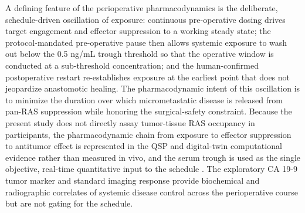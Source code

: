 A defining feature of the perioperative pharmacodynamics is the deliberate,
schedule-driven oscillation of exposure: continuous pre-operative dosing drives
target engagement and effector suppression to a working steady state; the
protocol-mandated pre-operative pause then allows systemic exposure to wash out
below the 0.5 ng/mL trough threshold so that the operative window is conducted at
a sub-threshold concentration; and the human-confirmed postoperative restart
re-establishes exposure at the earliest point that does not jeopardize anastomotic
healing. The pharmacodynamic intent of this oscillation is to minimize the
duration over which micrometastatic disease is released from pan-RAS suppression
while honoring the surgical-safety constraint. Because the present study does not
directly assay tumor-tissue RAS occupancy in participants, the pharmacodynamic
chain from exposure to effector suppression to antitumor effect is represented in
the QSP and digital-twin computational evidence rather than measured in vivo, and
the serum trough is used as the single objective, real-time quantitative input to
the schedule \cite{qspmetpancre,fdadigtwinpc,onpremwhippl}. The exploratory CA
19-9 tumor marker and standard imaging response provide biochemical and
radiographic correlates of systemic disease control across the perioperative
course but are not gating for the schedule.



